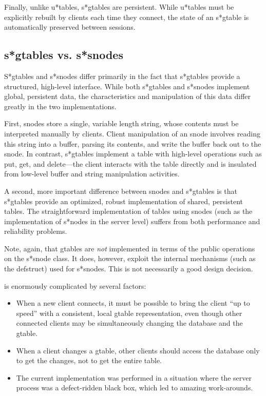 Finally, unlike u*tables, s*gtables are persistent.  While u*tables
must be explicitly rebuilt by clients each time they connect, the
state of an s*gtable is automatically preserved between sessions.

\subsection{s*gtables vs. s*snodes}

S*gtables and s*snodes differ primarily in the fact that s*gtables provide a
structured, high-level interface.  While both s*gtables and s*snodes
implement global, persistent data, the characteristics and
manipulation of this data differ greatly in the two implementations.

First, snodes store a single, variable length string, whose contents
must be interpreted manually by clients.  Client manipulation of an
snode involves reading this string into a buffer, parsing its
contents, and write the buffer back out to the snode.  In contrast,
s*gtables implement a table with high-level operations such as put,
get, and delete---the client interacts with the table directly and is
insulated from low-level buffer and string manipulation activities.

A second, more important difference between snodes and s*gtables is
that s*gtables provide an optimized, robust implementation of shared,
persistent tables.  The straightforward implementation of tables using
snodes (such as the implementation of s*nodes in the server level)
suffers from both performance and reliability problems.

Note, again, that gtables are {\em not} implemented in terms of the public
operations on the s*snode class.  It does, however, exploit the internal
mechanisms (such as the defstruct) used for s*snodes. This is not
necessarily a good design decision.


\paragrs is enormously complicated by several
factors:
\begin{itemize}
\item When a new client connects, it must be possible to bring the client
  ``up to speed'' with a consistent, local gtable representation, even
  though other connected clients may be simultaneously changing the
  database and the gtable.
\item When a client changes a gtable, other clients should access the
  database only to get the changes, not to get the entire table.
\item The current implementation was performed in a situation where the
  server process was a defect-ridden black box, which led to amazing
  work-arounds. 
\end{itemize}


